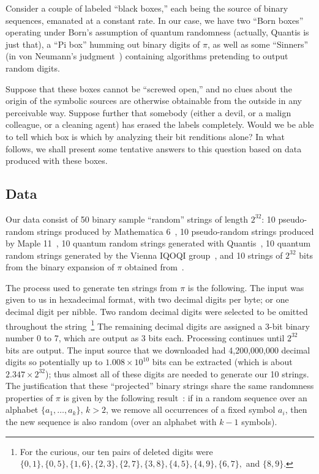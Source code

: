 \documentclass[%
 preprint,
 showpacs,
 showkeys,
 preprintnumbers,
 amsmath,amssymb,
 aps,
 prl,
  longbibliography,
 ]{revtex4-1}
\begin{document}
Consider a couple of labeled ``black boxes,'' each being the source
of binary sequences, emanated at a constant rate.
In our case, we have two ``Born boxes'' operating under Born's
assumption of quantum randomness (actually, Quantis is just that),
a ``Pi box'' humming out binary digits of $\pi$, as well as some
``Sinners'' (in von Neumann's judgment~\cite{von-neumann1})
containing algorithms pretending to
output random digits.

Suppose that these boxes cannot be ``screwed open,'' and no clues
about the origin of the symbolic sources are otherwise obtainable
from the outside in any perceivable way.
Suppose further that somebody (either a devil, or a malign colleague,
or a cleaning agent) has erased the labels completely.
Would we be able to tell which box is which by analyzing their bit
renditions alone?
In what follows, we shall present some tentative answers to this question
based on data produced with these boxes.


 \subsection{Data}
Our data consist of 50 binary sample ``random'' strings  of length
$2^{32}$: 10 pseudo-random strings  produced by Mathematica 6~\cite{MRG},
10 pseudo-random strings  produced by  Maple 11~\cite{MAPLE}, 10 quantum random strings
generated with  Quantis~\cite{Quantis}, 10 quantum random strings
generated by the Vienna IQOQI group~\cite{Vienna},
and  10 strings of $2^{32}$ bits from the binary expansion of $\pi$ obtained from~\cite{pi}.

The process used to generate ten strings from $\pi$ is the following.   The input was given
to us in hexadecimal format, with two decimal digits per byte; or one decimal digit per nibble.
Two random decimal digits were selected to be omitted throughout the string~\footnote{For the curious, our ten pairs
of deleted digits were $\{0,1\},\{0,5\},\{1,6\},\{2,3\},\{2,7\},\{3,8\},\{4,5\},\{4,9\},\{6,7\},$
and $\{8,9\}$.} The remaining decimal digits are assigned a 3-bit binary number 0 to 7,
which are output as 3 bits each.
Processing continues until $2^{32}$  bits are output.
The input source that we downloaded had 4,200,000,000 decimal digits so potentially up to
$1.008\times 10^{10}$ bits can be extracted (which is about $2.347 \times 2^{32}$);
thus
almost all of these digits are needed to generate our 10 strings. The
justification that these ``projected'' binary strings share the same randomness properties of
$\pi$ is given by the following result~\cite{calude:02}: if in a random sequence over an alphabet $\{a_{1}, \ldots , a_{k}\}$, $k>2$, we remove all occurrences of a
fixed symbol $a_{i}$, then the new sequence is also random (over
an alphabet with $k-1$ symbols).
\end{document}
